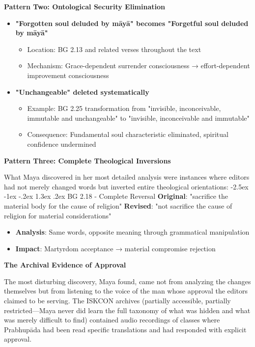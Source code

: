 \documentclass[12pt,twoside]{book}
\makeatletter
\renewcommand\section{\@startsection{section}{1}{\z@}%
{-2.5ex \@plus -1ex \@minus -.2ex}%
{1.3ex \@plus.2ex}%
{\normalfont\Large\bfseries}}
\makeatother
\begin{document}
\textbf{\textbf{Pattern Two: Ontological Security Elimination}}  
\begin{itemize}
\item \textbf{\textbf{"Forgotten soul deluded by māyā" becomes "Forgetful soul deluded by māyā"}}
\begin{itemize}
\item Location: BG 2.13 and related verses throughout the text
\item Mechanism: Grace-dependent surrender consciousness → effort-dependent improvement consciousness
\end{itemize}

\item \textbf{\textbf{"Unchangeable" deleted systematically}}
\begin{itemize}
\item Example: BG 2.25 transformation from "invisible, inconceivable, immutable and unchangeable" to "invisible, inconceivable and immutable"
\item Consequence: Fundamental soul characteristic eliminated, spiritual confidence undermined
\end{itemize}
\end{itemize}

\textbf{\textbf{Pattern Three: Complete Theological Inversions}}

What Maya discovered in her most detailed analysis were instances where editors had not merely changed words but inverted entire theological orientations:
\section{BG 2.18 - Complete Reversal}
\label{sec:org08c5674}
\textbf{\textbf{Original}}: "sacrifice the material body for the cause of religion" 
\textbf{\textbf{Revised}}: "not sacrifice the cause of religion for material considerations"
\begin{itemize}
\item \textbf{\textbf{Analysis}}: Same words, opposite meaning through grammatical manipulation
\item \textbf{\textbf{Impact}}: Martyrdom acceptance → material compromise rejection
\end{itemize}

\textbf{\textbf{The Archival Evidence of Approval}}

The most disturbing discovery, Maya found, came not from analyzing the changes themselves but from listening to the voice of the man whose approval the editors claimed to be serving. The ISKCON archives (partially accessible, partially restricted—Maya never did learn the full taxonomy of what was hidden and what was merely difficult to find) contained audio recordings of classes where Prabhupāda had been read specific translations and had responded with explicit approval.
\end{document}
